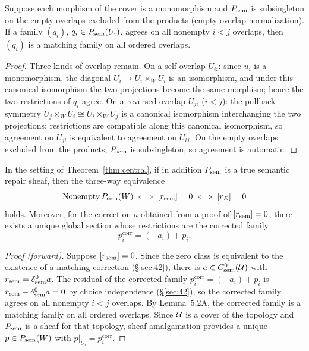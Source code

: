 \begin{lemmafiveA}
Suppose each morphism of the cover is a monomorphism and $P_{\mathrm{sem}}$ is
subsingleton on the empty overlaps excluded from the products
(empty-overlap normalization). If a family $(q_i)$,
$q_i\in P_{\mathrm{sem}}(U_i)$, agrees on all nonempty $i<j$ overlaps, then
$(q_i)$ is a matching family on all ordered overlaps.
\end{lemmafiveA}

\begin{proof}
Three kinds of overlap remain. On a self-overlap $U_{ii}$: since $u_i$
is a monomorphism, the diagonal $U_i\to U_i\times_W U_i$ is an
isomorphism, and under this canonical isomorphism the two projections
become the same morphism; hence the two restrictions of $q_i$ agree.
On a reversed overlap $U_{ji}$ ($i<j$): the pullback symmetry
$U_j\times_W U_i\cong U_i\times_W U_j$ is a canonical isomorphism
interchanging the two projections; restrictions are compatible along
this canonical isomorphism, so agreement on $U_{ji}$ is equivalent to
agreement on $U_{ij}$. On the empty overlaps excluded from the
products, $P_{\mathrm{sem}}$ is subsingleton, so agreement is automatic.
\end{proof}

\begin{theorem}\label{thm:gluing}
In the setting of Theorem~\ref{thm:central}, if in addition $P_{\mathrm{sem}}$ is
a true semantic repair sheaf, then the three-way equivalence
\[
\mathrm{Nonempty}\,P_{\mathrm{sem}}(W)
\iff
[r_{\mathrm{sem}}]=0
\iff
[r_{E}]=0
\]
holds. Moreover, for the correction $a$ obtained from a proof of
$[r_{\mathrm{sem}}]=0$, there exists a unique global section whose restrictions
are the corrected family
\[
p_i^{\mathrm{corr}}=(-a_i)+p_i.
\]
\end{theorem}

\begin{proof}[Proof (forward)]
Suppose $[r_{\mathrm{sem}}]=0$. Since the zero class is equivalent to the
existence of a matching correction (\S\ref{sec:42}), there is
$a\in C^0_{\mathrm{sem}}(\mathcal{U})$ with $r_{\mathrm{sem}}=\delta^0_{\mathrm{sem}}a$.
The residual of the corrected family $p_i^{\mathrm{corr}}=(-a_i)+p_i$
is $r_{\mathrm{sem}}-\delta^0_{\mathrm{sem}}a=0$ by choice independence (\S\ref{sec:42}), so the
corrected family agrees on all nonempty $i<j$ overlaps. By
Lemma~5.2A, the corrected family is a matching family on all ordered
overlaps. Since $\mathcal{U}$ is a cover of the topology and $P_{\mathrm{sem}}$ is a sheaf
for that topology, sheaf amalgamation provides a unique
$p\in P_{\mathrm{sem}}(W)$ with $p|_{U_i}=p_i^{\mathrm{corr}}$.
\end{proof}

